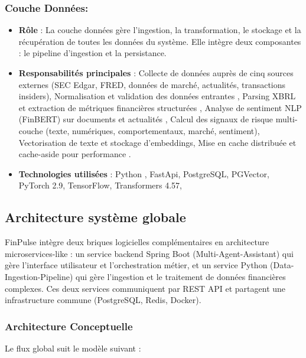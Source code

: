 \subsubsection*{Couche  Données:}
\begin{itemize}
    \item \textbf{Rôle} :  La couche données gère l'ingestion, la transformation, le stockage et la récupération de toutes les données du système. Elle intègre deux composantes : le pipeline d'ingestion et la persistance.
    \item \textbf{Responsabilités principales} : Collecte de données auprès de cinq sources externes (SEC Edgar, FRED, données de marché, actualités, transactions insiders),  Normalisation et validation des données entrantes , Parsing XBRL et extraction de métriques financières structurées
    , Analyse de sentiment NLP (FinBERT) sur documents et actualités ,  Calcul des signaux de risque multi-couche (texte, numériques, comportementaux, marché, sentiment), Vectorisation de texte et stockage d'embeddings, Mise en cache distribuée et cache-aside pour performance .
    \item \textbf{Technologies utilisées} : Python , FastApi, PostgreSQL, PGVector, PyTorch 2.9, TensorFlow, Transformers 4.57, 

\end{itemize}
\subsection{Architecture système globale}
FinPulse intègre deux briques logicielles complémentaires en architecture microservices-like : un service backend Spring Boot (Multi-Agent-Assistant) qui gère l'interface utilisateur et l'orchestration métier, et un service Python (Data-Ingestion-Pipeline) qui gère l'ingestion et le traitement de données financières complexes. Ces deux services communiquent par REST API et partagent une infrastructure commune (PostgreSQL, Redis, Docker).
\subsubsection{Architecture Conceptuelle}
Le flux global suit le modèle suivant :

